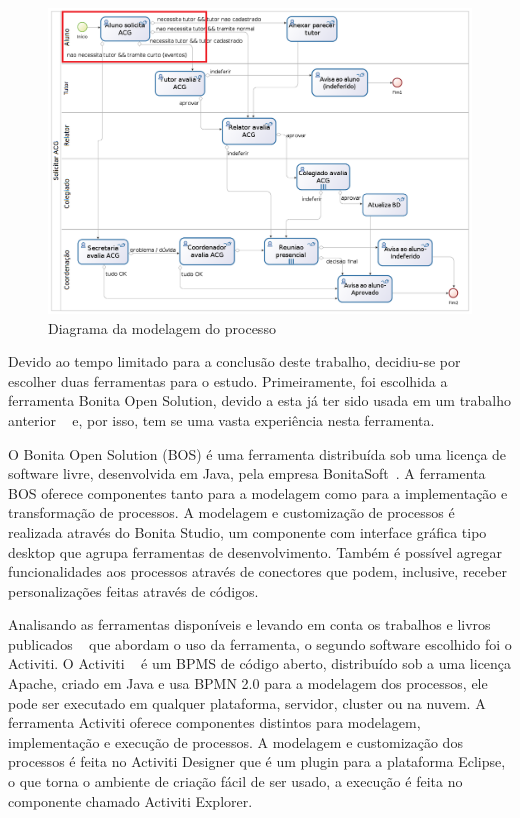 \documentclass[12pt]{article}
\begin{document}
\begin{figure}[ht]
\centering
\includegraphics[width=.99\textwidth]{imagens/processo.png}
\caption{Diagrama da modelagem do processo}
\label{fig:diagrama}
\end{figure}

Devido ao tempo limitado para a conclusão deste trabalho, decidiu-se por escolher duas ferramentas para o estudo. Primeiramente, foi escolhida a ferramenta Bonita Open Solution, devido a esta já ter sido usada em um trabalho anterior ~\cite{sbsi2013} e, por isso, tem se uma vasta experiência nesta ferramenta.

O Bonita Open Solution (BOS) é uma ferramenta distribuída sob uma licença de software livre, desenvolvida em Java, pela empresa BonitaSoft~\cite{BONITASOFT}. A ferramenta BOS oferece componentes tanto para a modelagem como para a implementação e transformação de processos. A modelagem e customização de processos é realizada através do Bonita Studio, um componente com interface gráfica tipo desktop que agrupa ferramentas de desenvolvimento. Também é possível agregar funcionalidades aos processos através de conectores que podem, inclusive, receber personalizações feitas através de códigos.

Analisando as ferramentas disponíveis e levando em conta os trabalhos e livros publicados ~\cite{rademakers2012activiti} que abordam o uso da ferramenta, o segundo software escolhido foi o Activiti. O Activiti ~\cite{ACTIVITI} é um BPMS de código aberto, distribuído sob a uma licença Apache, criado em Java e usa  BPMN 2.0 para a modelagem dos processos, ele pode ser executado em qualquer plataforma, servidor, cluster ou na nuvem. A ferramenta Activiti oferece componentes distintos para modelagem, implementação e execução de processos. A modelagem e customização dos processos é feita no Activiti Designer que é um plugin para a plataforma Eclipse, o que torna o ambiente de criação fácil de ser usado, a execução é feita no componente chamado Activiti Explorer.
\end{document}
